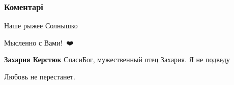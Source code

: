  
 
 
 
 
\subsubsection{Коментарі}
\label{sec:28_07_2021.fb.bilchenko_evgenia.1.nastrojenie_vyzhyt.cmt}

\begin{itemize}

 
Наше рыжее Солнышко

 
Мысленно с Вами!🙏🙏❤️

 
\textbf{Захария Керстюк} СпасиБог, мужественный отец Захария. Я не подведу


 
Любовь не перестанет.

 

\end{itemize}
